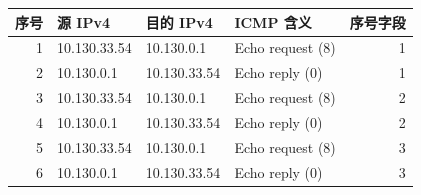 \begin{tabular}{rlllr}\toprule
序号 & 源 IPv4 & 目的 IPv4 & ICMP 含义 & 序号字段 \\ \midrule
1 & 10.130.33.54 & 10.130.0.1 & Echo request (8) & 1 \\
2 & 10.130.0.1 & 10.130.33.54 & Echo reply (0) & 1 \\
3 & 10.130.33.54 & 10.130.0.1 & Echo request (8) & 2 \\
4 & 10.130.0.1 & 10.130.33.54 & Echo reply (0) & 2 \\
5 & 10.130.33.54 & 10.130.0.1 & Echo request (8) & 3 \\
6 & 10.130.0.1 & 10.130.33.54 & Echo reply (0) & 3 \\
\bottomrule\end{tabular}
